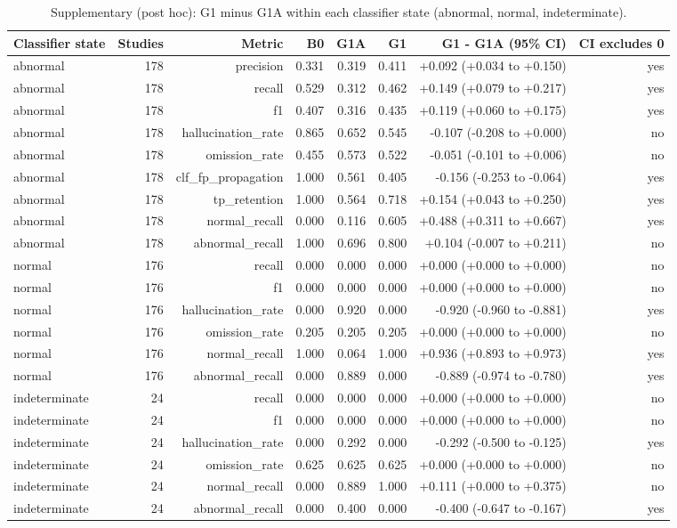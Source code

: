 \begin{table}[t]
\centering
\scriptsize
\begin{tabular}{lrrrrrrr}
\hline
Classifier state & Studies & Metric & B0 & G1A & G1 & G1 - G1A (95\% CI) & CI excludes 0 \\
\hline
abnormal & 178 & precision & 0.331 & 0.319 & 0.411 & +0.092 (+0.034 to +0.150) & yes \\
abnormal & 178 & recall & 0.529 & 0.312 & 0.462 & +0.149 (+0.079 to +0.217) & yes \\
abnormal & 178 & f1 & 0.407 & 0.316 & 0.435 & +0.119 (+0.060 to +0.175) & yes \\
abnormal & 178 & hallucination\_rate & 0.865 & 0.652 & 0.545 & -0.107 (-0.208 to +0.000) & no \\
abnormal & 178 & omission\_rate & 0.455 & 0.573 & 0.522 & -0.051 (-0.101 to +0.006) & no \\
abnormal & 178 & clf\_fp\_propagation & 1.000 & 0.561 & 0.405 & -0.156 (-0.253 to -0.064) & yes \\
abnormal & 178 & tp\_retention & 1.000 & 0.564 & 0.718 & +0.154 (+0.043 to +0.250) & yes \\
abnormal & 178 & normal\_recall & 0.000 & 0.116 & 0.605 & +0.488 (+0.311 to +0.667) & yes \\
abnormal & 178 & abnormal\_recall & 1.000 & 0.696 & 0.800 & +0.104 (-0.007 to +0.211) & no \\
normal & 176 & recall & 0.000 & 0.000 & 0.000 & +0.000 (+0.000 to +0.000) & no \\
normal & 176 & f1 & 0.000 & 0.000 & 0.000 & +0.000 (+0.000 to +0.000) & no \\
normal & 176 & hallucination\_rate & 0.000 & 0.920 & 0.000 & -0.920 (-0.960 to -0.881) & yes \\
normal & 176 & omission\_rate & 0.205 & 0.205 & 0.205 & +0.000 (+0.000 to +0.000) & no \\
normal & 176 & normal\_recall & 1.000 & 0.064 & 1.000 & +0.936 (+0.893 to +0.973) & yes \\
normal & 176 & abnormal\_recall & 0.000 & 0.889 & 0.000 & -0.889 (-0.974 to -0.780) & yes \\
indeterminate & 24 & recall & 0.000 & 0.000 & 0.000 & +0.000 (+0.000 to +0.000) & no \\
indeterminate & 24 & f1 & 0.000 & 0.000 & 0.000 & +0.000 (+0.000 to +0.000) & no \\
indeterminate & 24 & hallucination\_rate & 0.000 & 0.292 & 0.000 & -0.292 (-0.500 to -0.125) & yes \\
indeterminate & 24 & omission\_rate & 0.625 & 0.625 & 0.625 & +0.000 (+0.000 to +0.000) & no \\
indeterminate & 24 & normal\_recall & 0.000 & 0.889 & 1.000 & +0.111 (+0.000 to +0.375) & no \\
indeterminate & 24 & abnormal\_recall & 0.000 & 0.400 & 0.000 & -0.400 (-0.647 to -0.167) & yes \\
\hline
\end{tabular}
\caption{Supplementary (post hoc): G1 minus G1A within each classifier state (abnormal, normal, indeterminate).}
\label{tab:table6_supplementary_stratified_by_classifier_state}
\end{table}
